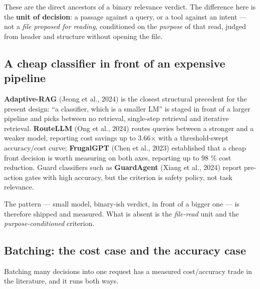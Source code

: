 \documentclass[11pt,a4paper]{article}
\begin{document}
These are the direct ancestors of a binary relevance verdict. The difference here is the \textbf{unit of decision}: a passage against a query, or a tool against an intent --- not a \emph{file proposed for reading}, conditioned on the \emph{purpose} of that read, judged from header and structure without opening the file.

\subsection{A cheap classifier in front of an expensive pipeline}

\textbf{Adaptive-RAG} (Jeong et al., 2024)\cite{ref4} is the closest structural precedent for the present design: ``a classifier, which is a smaller LM'' is staged in front of a larger pipeline and picks between no retrieval, single-step retrieval and iterative retrieval. \textbf{RouteLLM} (Ong et al., 2024)\cite{ref8} routes queries between a stronger and a weaker model, reporting cost savings up to 3.66$\times$ with a threshold-swept accuracy/cost curve; \textbf{FrugalGPT} (Chen et al., 2023)\cite{ref2} established that a cheap front decision is worth measuring on both axes, reporting up to 98 \% cost reduction. Guard classifiers such as \textbf{GuardAgent} (Xiang et al., 2024)\cite{ref12} report pre-action gates with high accuracy, but the criterion is safety policy, not task relevance.

The pattern --- small model, binary-ish verdict, in front of a bigger one --- is therefore shipped and measured. What is absent is the \emph{file-read} unit and the \emph{purpose-conditioned} criterion.

\subsection{Batching: the cost case and the accuracy case}

Batching many decisions into one request has a measured cost/accuracy trade in the literature, and it runs both ways.
\end{document}
